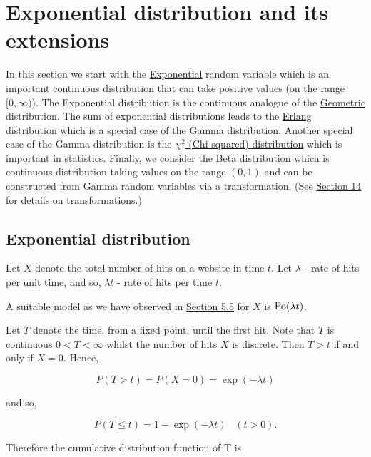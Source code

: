 \documentclass[
]{book}
\begin{document}
\hypertarget{rv:exponential}{%
\section{Exponential distribution and its extensions}\label{rv:exponential}}

In this section we start with the \protect\hyperlink{rv:exponential:exp}{Exponential} random variable which is an important continuous distribution that can take positive values (on the range \([0,\infty)\)). The Exponential distribution is the continuous analogue of the \protect\hyperlink{rv:Bernoulli:geom}{Geometric} distribution. The sum of exponential distributions leads to the \href{https://en.wikipedia.org/wiki/Erlang_distribution}{Erlang distribution} which is a special case of the \protect\hyperlink{rv:exponential:gamma}{Gamma distribution}. Another special case of the Gamma distribution is the \protect\hyperlink{rv:exponential:chi}{\(\chi^2\) (Chi squared) distribution} which is important in statistics. Finally, we consider the \protect\hyperlink{rv:exponential:beta}{Beta distribution} which is continuous distribution taking values on the range \((0,1)\) and can be constructed from Gamma random variables via a transformation. (See \protect\hyperlink{Transform}{Section 14} for details on transformations.)

\hypertarget{rv:exponential:exp}{%
\subsection{Exponential distribution}\label{rv:exponential:exp}}

Let \(X\) denote the total number of hits on a website in time \(t\).
Let \(\lambda\) - rate of hits per unit time, and so, \(\lambda t\) -
rate of hits per time \(t\).

A suitable model as we have observed in \protect\hyperlink{rv:Poisson}{Section 5.5} for \(X\) is \({\rm Po} (\lambda t)\).

Let \(T\) denote the time, from a fixed point, until the first hit. Note that \(T\) is
continuous \(0 < T < \infty\) whilst the number of hits \(X\) is
discrete. Then \(T > t\) if and only if \(X=0\). Hence,

\[  P(T > t) = P (X=0) = \exp(-\lambda t) \]

and so,

\[ P (T \leq t) = 1 - \exp(-\lambda t) \; \; \; (t > 0). \]

Therefore the cumulative distribution function of T is
\end{document}
